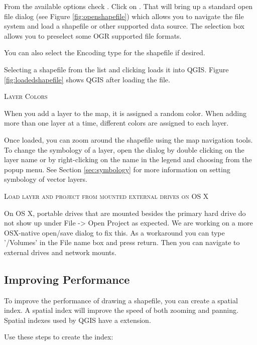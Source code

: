 From the available options check . Click on . 
That will bring up a standard open file dialog (see Figure
\ref{fig:openshapefile}) which allows you to navigate the file system and load
a shapefile or other supported data source. 
The selection box  allows you to preselect some OGR supported file formats.

You can also select the Encoding type for the shapefile if desired.

Selecting a shapefile from the list and clicking  loads it into QGIS. Figure
\ref{fig:loadedshapefile} shows QGIS after loading the  file.


\begin{Tip}\caption{\textsc{Layer Colors}}
When you add a layer to the map, it is assigned a random color. When
adding more than one layer at a time, different colors are assigned to each layer.
\end{Tip}

Once loaded, you can zoom around the shapefile using the map navigation tools.
To change the symbology of a layer, open the  dialog by double
clicking on the layer name or by right-clicking on the name in the legend and
choosing  from the popup menu. See
Section \ref{sec:symbology} for more information on setting symbology of
vector layers.
 
\begin{Tip}\caption{\textsc{Load layer and project from mounted external
drives on OS X}}
On OS X, portable drives that are mounted besides the primary hard
drive do not show up under File -> Open Project as expected. We are working
on a more OSX-native open/save dialog to fix this. As a workaround you can
type '/Volumes' in the File name box and press return. Then you can navigate
to external drives and network mounts.
\end{Tip}
 
\subsection{Improving Performance}

To improve the performance of drawing a shapefile, you can create a spatial
index. A  spatial index will improve the 
speed of both zooming and panning. Spatial indexes used by QGIS have a 
 extension.

Use these steps to create the index:

